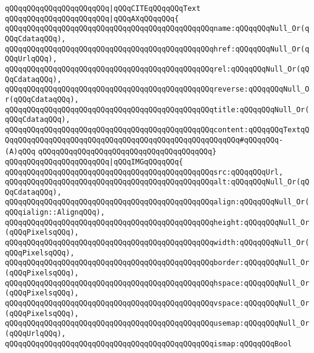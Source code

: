 \verb|qQQqqQQqqQQqqQQqqQQqqQQq|\verb#|qQQqCITEqQQqqQQqText#\newline
\verb|qQQqqQQqqQQqqQQqqQQqqQQq|\verb#|qQQqAXqQQqqQQq{#\newline
\verb|qQQqqQQqqQQqqQQqqQQqqQQqqQQqqQQqqQQqqQQqqQQqqQQqname:qQQqqQQqNull_Or(qQQqCdataqQQq),|\newline
\verb|qQQqqQQqqQQqqQQqqQQqqQQqqQQqqQQqqQQqqQQqqQQqqQQqhref:qQQqqQQqNull_Or(qQQqUrlqQQq),|\newline
\verb|qQQqqQQqqQQqqQQqqQQqqQQqqQQqqQQqqQQqqQQqqQQqqQQqrel:qQQqqQQqNull_Or(qQQqCdataqQQq),|\newline
\verb|qQQqqQQqqQQqqQQqqQQqqQQqqQQqqQQqqQQqqQQqqQQqqQQqreverse:qQQqqQQqNull_Or(qQQqCdataqQQq),|\newline
\verb|qQQqqQQqqQQqqQQqqQQqqQQqqQQqqQQqqQQqqQQqqQQqqQQqtitle:qQQqqQQqNull_Or(qQQqCdataqQQq),|\newline
\verb|qQQqqQQqqQQqqQQqqQQqqQQqqQQqqQQqqQQqqQQqqQQqqQQqcontent:qQQqqQQqTextqQQqqQQqqQQqqQQqqQQqqQQqqQQqqQQqqQQqqQQqqQQqqQQqqQQqqQQq#qQQqqQQq-(A)qQQq|\newline
\verb|qQQqqQQqqQQqqQQqqQQqqQQqqQQqqQQqqQQqqQQq}|\newline
\verb|qQQqqQQqqQQqqQQqqQQqqQQq|\verb#|qQQqIMGqQQqqQQq{#\newline
\verb|qQQqqQQqqQQqqQQqqQQqqQQqqQQqqQQqqQQqqQQqqQQqqQQqsrc:qQQqqQQqUrl,|\newline
\verb|qQQqqQQqqQQqqQQqqQQqqQQqqQQqqQQqqQQqqQQqqQQqqQQqalt:qQQqqQQqNull_Or(qQQqCdataqQQq),|\newline
\verb|qQQqqQQqqQQqqQQqqQQqqQQqqQQqqQQqqQQqqQQqqQQqqQQqalign:qQQqqQQqNull_Or(qQQqialign::AlignqQQq),|\newline
\verb|qQQqqQQqqQQqqQQqqQQqqQQqqQQqqQQqqQQqqQQqqQQqqQQqheight:qQQqqQQqNull_Or(qQQqPixelsqQQq),|\newline
\verb|qQQqqQQqqQQqqQQqqQQqqQQqqQQqqQQqqQQqqQQqqQQqqQQqwidth:qQQqqQQqNull_Or(qQQqPixelsqQQq),|\newline
\verb|qQQqqQQqqQQqqQQqqQQqqQQqqQQqqQQqqQQqqQQqqQQqqQQqborder:qQQqqQQqNull_Or(qQQqPixelsqQQq),|\newline
\verb|qQQqqQQqqQQqqQQqqQQqqQQqqQQqqQQqqQQqqQQqqQQqqQQqhspace:qQQqqQQqNull_Or(qQQqPixelsqQQq),|\newline
\verb|qQQqqQQqqQQqqQQqqQQqqQQqqQQqqQQqqQQqqQQqqQQqqQQqvspace:qQQqqQQqNull_Or(qQQqPixelsqQQq),|\newline
\verb|qQQqqQQqqQQqqQQqqQQqqQQqqQQqqQQqqQQqqQQqqQQqqQQqusemap:qQQqqQQqNull_Or(qQQqUrlqQQq),|\newline
\verb|qQQqqQQqqQQqqQQqqQQqqQQqqQQqqQQqqQQqqQQqqQQqqQQqismap:qQQqqQQqBool|\newline
